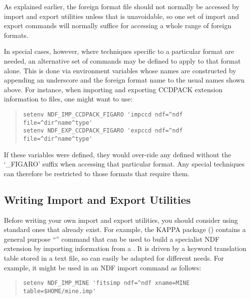As explained earlier, the foreign format file should not normally be
accessed by import and export utilities unless that is unavoidable, so
one set of import and export commands will normally suffice for
accessing a whole range of foreign formats.

In special cases, however, where techniques specific to a particular
format are needed, an alternative set of commands may be defined to
apply to that format alone.  This is done via environment variables
whose names are constructed by appending an underscore and the foreign
format name to the usual names shown above. For instance, when
importing and exporting CCDPACK extension information to
 files, one might want to use:

\begin{quote}
\begin{small}
\begin{verbatim}
setenv NDF_IMP_CCDPACK_FIGARO 'impccd ndf=^ndf file=^dir^name^type'
setenv NDF_EXP_CCDPACK_FIGARO 'expccd ndf=^ndf file=^dir^name^type' 
\end{verbatim}
\end{small}
\end{quote}

If these variables were defined, they would over-ride any defined
without the `\_FIGARO' suffix when accessing that particular format.
Any special techniques can therefore be restricted to those formats
that require them.

\subsection{Writing Import and Export Utilities}

Before writing your own import and export utilities, you should
consider using standard ones that already exist. For example, the
KAPPA package () contains a general purpose
``'' command that can be used to build a
specialist NDF extension by importing information from a . It is driven by a keyword translation
table stored in a text file, so can easily be adapted for different
needs.  For example, it might be used in an NDF import command as
follows:

\begin{quote}
\begin{small}
\begin{verbatim}
setenv NDF_IMP_MINE 'fitsimp ndf=^ndf xname=MINE table=$HOME/mine.imp'
\end{verbatim}
\end{small}
\end{quote}


